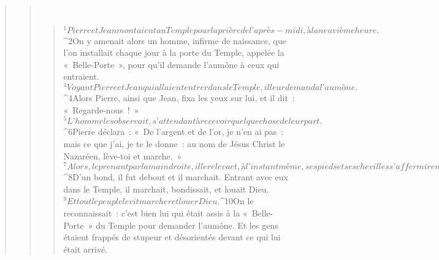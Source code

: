 \begin{verse}
\begin{verse}
         
      \bchapter{}
      \begin{verse}
${}^{1}Pierre et Jean montaient au Temple pour la prière de l’après-midi, à la neuvième heure. 
${}^{2}On y amenait alors un homme, infirme de naissance, que l’on installait chaque jour à la porte du Temple, appelée la « Belle-Porte », pour qu’il demande l’aumône à ceux qui entraient. 
${}^{3}Voyant Pierre et Jean qui allaient entrer dans le Temple, il leur demanda l’aumône. 
${}^{4}Alors Pierre, ainsi que Jean, fixa les yeux sur lui, et il dit : « Regarde-nous ! » 
${}^{5}L’homme les observait, s’attendant à recevoir quelque chose de leur part. 
${}^{6}Pierre déclara : « De l’argent et de l’or, je n’en ai pas ; mais ce que j’ai, je te le donne : au nom de Jésus Christ le Nazaréen, lève-toi et marche. » 
${}^{7}Alors, le prenant par la main droite, il le releva et, à l’instant même, ses pieds et ses chevilles s’affermirent. 
${}^{8}D’un bond, il fut debout et il marchait. Entrant avec eux dans le Temple, il marchait, bondissait, et louait Dieu. 
${}^{9}Et tout le peuple le vit marcher et louer Dieu. 
${}^{10}On le reconnaissait : c’est bien lui qui était assis à la « Belle-Porte » du Temple pour demander l’aumône. Et les gens étaient frappés de stupeur et désorientés devant ce qui lui était arrivé.
      

\end{verse}
\end{verse}
\end{verse}
